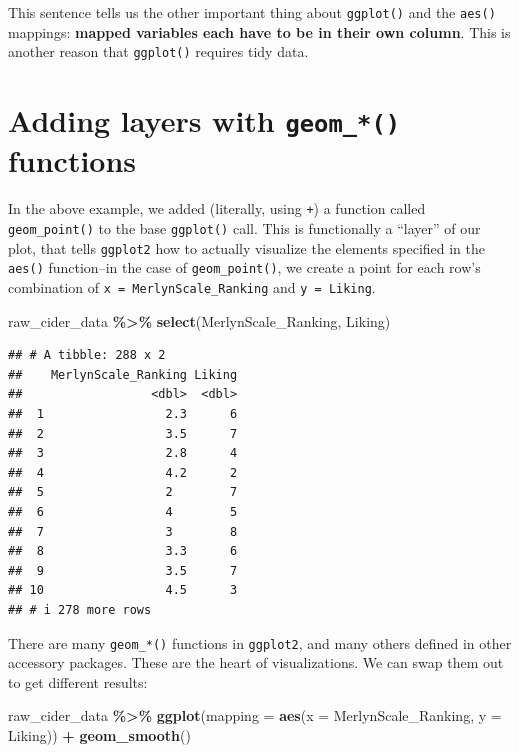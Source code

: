 \documentclass[
]{book}
\newenvironment{Shaded}{\begin{snugshade}}{\end{snugshade}}
\newcommand{\AttributeTok}[1]{\textcolor[rgb]{0.13,0.29,0.53}{#1}}
\newcommand{\FunctionTok}[1]{\textcolor[rgb]{0.13,0.29,0.53}{\textbf{#1}}}
\newcommand{\NormalTok}[1]{#1}
\newcommand{\SpecialCharTok}[1]{\textcolor[rgb]{0.81,0.36,0.00}{\textbf{#1}}}
\begin{document}
This sentence tells us the other important thing about \texttt{ggplot()} and the \texttt{aes()} mappings: \textbf{mapped variables each have to be in their own column}. This is another reason that \texttt{ggplot()} requires tidy data.

\hypertarget{adding-layers-with-geom_-functions}{%
\section{\texorpdfstring{Adding layers with \texttt{geom\_*()} functions}{Adding layers with geom\_*() functions}}\label{adding-layers-with-geom_-functions}}

In the above example, we added (literally, using \texttt{+}) a function called \texttt{geom\_point()} to the base \texttt{ggplot()} call. This is functionally a ``layer'' of our plot, that tells \texttt{ggplot2} how to actually visualize the elements specified in the \texttt{aes()} function--in the case of \texttt{geom\_point()}, we create a point for each row's combination of \texttt{x\ =\ MerlynScale\_Ranking} and \texttt{y\ =\ Liking}.

\begin{Shaded}
\begin{Highlighting}[]
\NormalTok{raw\_cider\_data }\SpecialCharTok{\%\textgreater{}\%}
  \FunctionTok{select}\NormalTok{(MerlynScale\_Ranking, Liking)}
\end{Highlighting}
\end{Shaded}

\begin{verbatim}
## # A tibble: 288 x 2
##    MerlynScale_Ranking Liking
##                  <dbl>  <dbl>
##  1                 2.3      6
##  2                 3.5      7
##  3                 2.8      4
##  4                 4.2      2
##  5                 2        7
##  6                 4        5
##  7                 3        8
##  8                 3.3      6
##  9                 3.5      7
## 10                 4.5      3
## # i 278 more rows
\end{verbatim}

There are many \texttt{geom\_*()} functions in \texttt{ggplot2}, and many others defined in other accessory packages. These are the heart of visualizations. We can swap them out to get different results:

\begin{Shaded}
\begin{Highlighting}[]
\NormalTok{raw\_cider\_data }\SpecialCharTok{\%\textgreater{}\%}
  \FunctionTok{ggplot}\NormalTok{(}\AttributeTok{mapping =} \FunctionTok{aes}\NormalTok{(}\AttributeTok{x =}\NormalTok{ MerlynScale\_Ranking, }\AttributeTok{y =}\NormalTok{ Liking)) }\SpecialCharTok{+} 
  \FunctionTok{geom\_smooth}\NormalTok{()}
\end{Highlighting}
\end{Shaded}
\end{document}
